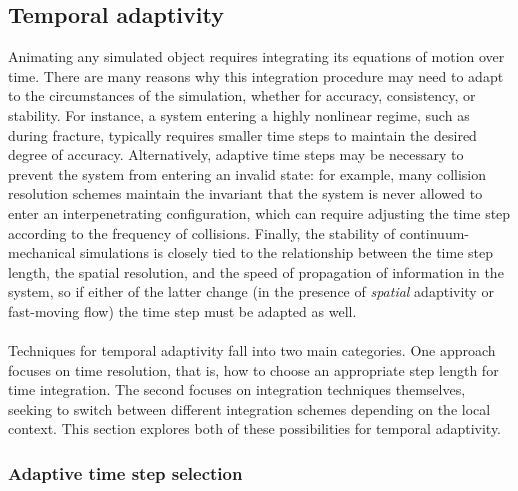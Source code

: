 \subsection{Temporal adaptivity} \label{sec t adaptivity}
Animating any simulated object requires integrating its equations of motion over time.
There are many reasons why this integration procedure may need to adapt to the circumstances of the simulation, whether for accuracy, consistency, or stability.
For instance, a system entering a highly nonlinear regime, such as during fracture, typically requires smaller time steps to maintain the desired degree of accuracy.
Alternatively, adaptive time steps may be necessary to prevent the system from entering an invalid state: for example, many collision resolution schemes maintain the invariant that the system is never allowed to enter an interpenetrating configuration, which can require adjusting the time step according to the frequency of collisions.
Finally, the stability of continuum-mechanical simulations is closely tied to the relationship between the time step length, the spatial resolution, and the speed of propagation of information in the system, so if either of the latter change (in the presence of \emph{spatial} adaptivity or fast-moving flow) the time step must be adapted as well.
\\ \\
Techniques for temporal adaptivity fall into two main categories.
One approach focuses on time resolution, that is, how to choose an appropriate step length for time integration.
The second focuses on integration techniques themselves, seeking to switch between different integration schemes depending on the local context. This section explores both of these possibilities for temporal adaptivity.

\subsubsection{Adaptive time step selection}

